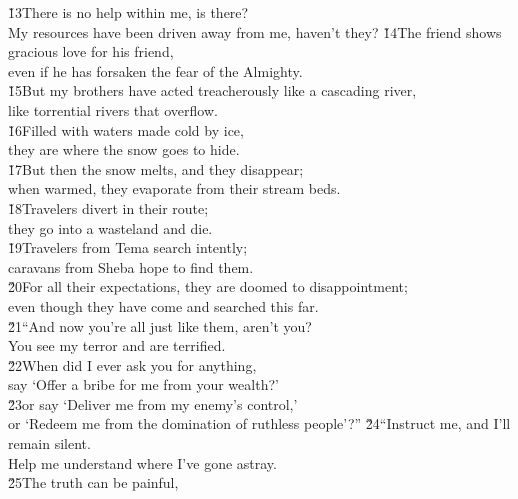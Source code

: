 \begin{poetry}
\poeml \v{13}There is no help within me, is there? \\
\poemll    My resources have been driven away from me, haven't they?
\poeml \v{14}The friend shows gracious love for his friend, \\
\poemll    even if he has forsaken the fear of the Almighty. \\
\poeml \v{15}But my brothers have acted treacherously like a cascading river, \\
\poemll    like torrential rivers that overflow. \\
\poeml \v{16}Filled with waters made cold by ice, \\
\poemll    they are where the snow goes to hide. \\
\poeml \v{17}But then the snow melts, and they disappear; \\
\poemll    when warmed, they evaporate from their stream beds. \\
\poeml \v{18}Travelers divert in their route; \\
\poemll    they go into a wasteland and die. \\
\poeml \v{19}Travelers from Tema search intently; \\
\poemll    caravans from Sheba hope to find them. \\
\poeml \v{20}For all their expectations, they are doomed to disappointment; \\
\poemll    even though they have come and searched this far. \\
\poeml \v{21}``And now you're all just like them, aren't you? \\
\poemll    You see my terror and are terrified. \\
\poeml \v{22}When did I ever ask you for anything, \\
\poemll    say `Offer a bribe for me from your wealth?' \\
\poeml \v{23}or say `Deliver me from my enemy's control,' \\
\poemll    or `Redeem me from the domination of ruthless people'?''
\poeml \v{24}``Instruct me, and I'll remain silent. \\
\poemll    Help me understand where I've gone astray. \\
\poeml \v{25}The truth can be painful, \\

\end{poetry}
